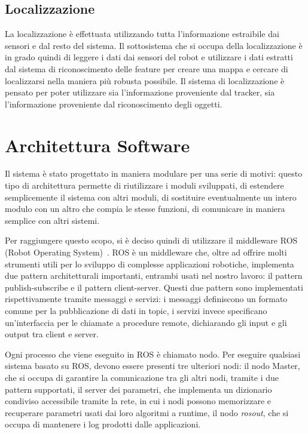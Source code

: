 \subsection{Localizzazione}
La localizzazione è effettuata utilizzando tutta l'informazione estraibile dai sensori e dal resto del sistema.
Il sottosistema che si occupa della localizzazione è in grado quindi di leggere i dati dai sensori del robot e utilizzare i dati estratti dal sistema di riconoscimento delle feature per creare una mappa e cercare di localizzarsi nella maniera più robusta possibile.
Il sistema di localizzazione è pensato per poter utilizzare sia l'informazione proveniente dal tracker, sia l'informazione proveniente dal riconoscimento degli oggetti.

\section{Architettura Software}
Il sistema è stato progettato in maniera modulare per una serie di motivi: questo tipo di architettura permette di riutilizzare i moduli sviluppati, di estendere semplicemente il sistema con altri moduli, di sostituire eventualmente un intero modulo con un altro che compia le stesse funzioni, di comunicare in maniera semplice con altri sistemi. 

Per raggiungere questo scopo, si è deciso quindi di utilizzare il middleware ROS (Robot Operating System)~\cite{quigley2009ros}.
ROS è un middleware che, oltre ad offrire molti strumenti utili per lo sviluppo di complesse applicazioni robotiche, implementa due pattern architetturali importanti, entrambi usati nel nostro lavoro: il pattern publish-subscribe e il pattern client-server.
Questi due pattern sono implementati rispettivamente tramite messaggi e servizi: i messaggi definiscono un formato comune per la pubblicazione di dati in topic, i servizi invece specificano un'interfaccia per le chiamate a procedure remote, dichiarando gli input e gli output tra client e server.

Ogni processo che viene eseguito in ROS è chiamato nodo. Per eseguire qualsiasi sistema basato su ROS, devono essere presenti tre ulteriori nodi: il nodo Master, che si occupa di garantire la comunicazione tra gli altri nodi, tramite i due pattern supportati, il server dei parametri, che implementa un dizionario condiviso accessibile tramite la rete, in cui i nodi possono memorizzare e recuperare parametri usati dai loro algoritmi a runtime, il nodo \textit{rosout}, che si occupa di mantenere i log prodotti dalle applicazioni.

